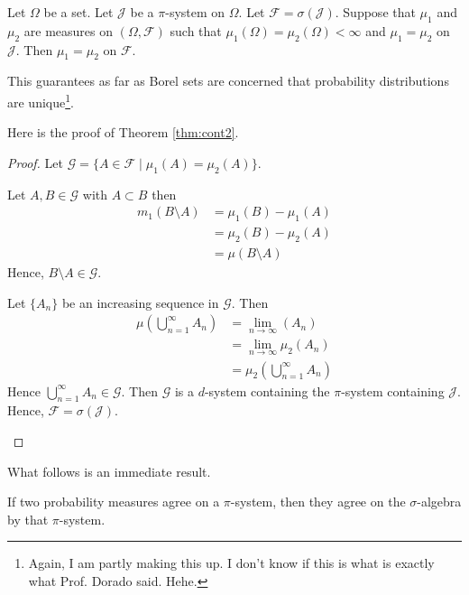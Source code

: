 \begin{theorem}\label{thm:cont2}
Let $\Omega$ be a set. Let $\mathcal J$ be a $\pi$-system on $\Omega$. Let $\mathcal F=\sigma(\mathcal J)$. Suppose that $\mu_1$ and $\mu_2$ are measures on $(\Omega, \mathcal F)$ such that $\mu_1(\Omega)=\mu_2(\Omega)<\infty$ and $\mu_1=\mu_2$ on $\mathcal J$. Then $\mu_1=\mu_2$ on $\mathcal F$.
\end{theorem}

\begin{notes}
This guarantees as far as Borel sets are concerned that probability distributions are unique\footnote{Again, I am partly making this up. I don't know if this is what is exactly what Prof. Dorado said. Hehe.}.
\end{notes}

Here is the proof of Theorem \ref{thm:cont2}.

\begin{proof}
Let $\mathcal G=\{A\in \mathcal F\mid \mu_1(A)=\mu_2(A)\}$.
\begin{prooflist}
\item

Let $A, B\in \mathcal G$ with $A\subset B$ then
\begin{align}
m_1(B\setminus A)&=\mu_1(B)-\mu_1(A)\\
&=\mu_2(B)-\mu_2(A)\\
&=\mu(B\setminus A)
\end{align}
Hence, $B\setminus A\in \mathcal G$.
\item 



 Let $\{A_n\}$ be an increasing sequence in $\mathcal G$. Then
\begin{align*}
\mu\left(\bigcup_{n=1}^\infty A_n\right)&=\lim\limits_{n\to\infty}(A_n)\\
&=\lim\limits_{n\to\infty} \mu_2(A_n)\\
&=\mu_2\left(\bigcup_{n=1}^\infty A_n\right)
\end{align*}
Hence $\bigcup_{n=1}^\infty A_n\in\mathcal G$. Then $\mathcal G$ is a $d$-system containing the $\pi$-system containing $\mathcal J$. Hence, $\mathcal F=\sigma(\mathcal J)$.
\end{prooflist}
\end{proof}

What follows is an immediate result.

\begin{corollary}
If two probability measures agree on a $\pi$-system, then they agree on the $\sigma$-algebra by that $\pi$-system.
\end{corollary}